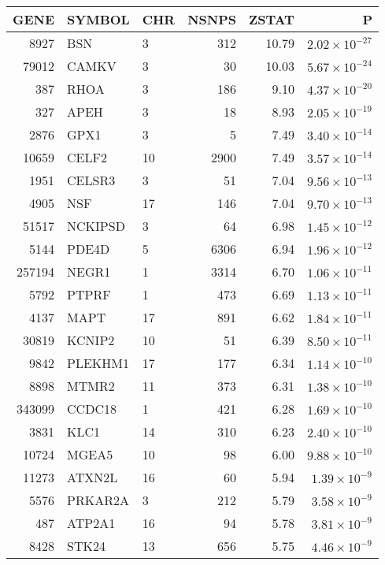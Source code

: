 \begin{table}[ht]
\centering
\begin{tabular}{rllrrr}
  \hline
GENE & SYMBOL & CHR & NSNPS & ZSTAT & P \\ 
  \hline
8927 & BSN & 3 & 312 & 10.79 & $2.02 \times 10^{-27}$ \\ 
  79012 & CAMKV & 3 &  30 & 10.03 & $5.67 \times 10^{-24}$ \\ 
  387 & RHOA & 3 & 186 & 9.10 & $4.37 \times 10^{-20}$ \\ 
  327 & APEH & 3 &  18 & 8.93 & $2.05 \times 10^{-19}$ \\ 
  2876 & GPX1 & 3 &   5 & 7.49 & $3.40 \times 10^{-14}$ \\ 
  10659 & CELF2 & 10 & 2900 & 7.49 & $3.57 \times 10^{-14}$ \\ 
  1951 & CELSR3 & 3 &  51 & 7.04 & $9.56 \times 10^{-13}$ \\ 
  4905 & NSF & 17 & 146 & 7.04 & $9.70 \times 10^{-13}$ \\ 
  51517 & NCKIPSD & 3 &  64 & 6.98 & $1.45 \times 10^{-12}$ \\ 
  5144 & PDE4D & 5 & 6306 & 6.94 & $1.96 \times 10^{-12}$ \\ 
  257194 & NEGR1 & 1 & 3314 & 6.70 & $1.06 \times 10^{-11}$ \\ 
  5792 & PTPRF & 1 & 473 & 6.69 & $1.13 \times 10^{-11}$ \\ 
  4137 & MAPT & 17 & 891 & 6.62 & $1.84 \times 10^{-11}$ \\ 
  30819 & KCNIP2 & 10 &  51 & 6.39 & $8.50 \times 10^{-11}$ \\ 
  9842 & PLEKHM1 & 17 & 177 & 6.34 & $1.14 \times 10^{-10}$ \\ 
  8898 & MTMR2 & 11 & 373 & 6.31 & $1.38 \times 10^{-10}$ \\ 
  343099 & CCDC18 & 1 & 421 & 6.28 & $1.69 \times 10^{-10}$ \\ 
  3831 & KLC1 & 14 & 310 & 6.23 & $2.40 \times 10^{-10}$ \\ 
  10724 & MGEA5 & 10 &  98 & 6.00 & $9.88 \times 10^{-10}$ \\ 
  11273 & ATXN2L & 16 &  60 & 5.94 & $1.39 \times 10^{-9}$ \\ 
  5576 & PRKAR2A & 3 & 212 & 5.79 & $3.58 \times 10^{-9}$ \\ 
  487 & ATP2A1 & 16 &  94 & 5.78 & $3.81 \times 10^{-9}$ \\ 
  8428 & STK24 & 13 & 656 & 5.75 & $4.46 \times 10^{-9}$ \\ 

\end{tabular}
\end{table}
